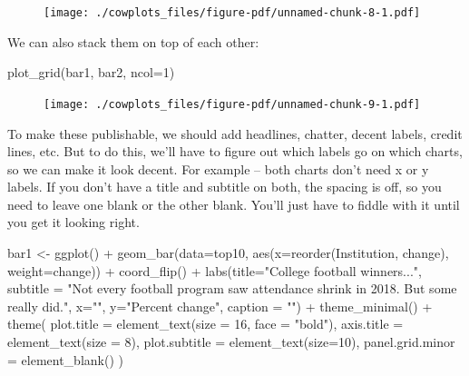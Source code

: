 \documentclass[
  letterpaper,
  DIV=11,
  numbers=noendperiod]{scrreprt}
\newenvironment{Shaded}{\begin{snugshade}}{\end{snugshade}}
\newcommand{\AttributeTok}[1]{\textcolor[rgb]{0.40,0.45,0.13}{#1}}
\newcommand{\DecValTok}[1]{\textcolor[rgb]{0.68,0.00,0.00}{#1}}
\newcommand{\FunctionTok}[1]{\textcolor[rgb]{0.28,0.35,0.67}{#1}}
\newcommand{\NormalTok}[1]{\textcolor[rgb]{0.00,0.23,0.31}{#1}}
\newcommand{\OtherTok}[1]{\textcolor[rgb]{0.00,0.23,0.31}{#1}}
\newcommand{\SpecialCharTok}[1]{\textcolor[rgb]{0.37,0.37,0.37}{#1}}
\newcommand{\StringTok}[1]{\textcolor[rgb]{0.13,0.47,0.30}{#1}}
\begin{document}
\begin{figure}[H]

{\centering \texttt{[image: ./cowplots\_files/figure-pdf/unnamed-chunk-8-1.pdf]}

}

\end{figure}

We can also stack them on top of each other:

\begin{Shaded}
\begin{Highlighting}[]
\FunctionTok{plot\_grid}\NormalTok{(bar1, bar2, }\AttributeTok{ncol=}\DecValTok{1}\NormalTok{) }
\end{Highlighting}
\end{Shaded}

\begin{figure}[H]

{\centering \texttt{[image: ./cowplots\_files/figure-pdf/unnamed-chunk-9-1.pdf]}

}

\end{figure}

To make these publishable, we should add headlines, chatter, decent
labels, credit lines, etc. But to do this, we'll have to figure out
which labels go on which charts, so we can make it look decent. For
example -- both charts don't need x or y labels. If you don't have a
title and subtitle on both, the spacing is off, so you need to leave one
blank or the other blank. You'll just have to fiddle with it until you
get it looking right.

\begin{Shaded}
\begin{Highlighting}[]
\NormalTok{bar1 }\OtherTok{\textless{}{-}} \FunctionTok{ggplot}\NormalTok{() }\SpecialCharTok{+} 
  \FunctionTok{geom\_bar}\NormalTok{(}\AttributeTok{data=}\NormalTok{top10, }\FunctionTok{aes}\NormalTok{(}\AttributeTok{x=}\FunctionTok{reorder}\NormalTok{(Institution, change), }\AttributeTok{weight=}\NormalTok{change)) }\SpecialCharTok{+}
  \FunctionTok{coord\_flip}\NormalTok{() }\SpecialCharTok{+} 
  \FunctionTok{labs}\NormalTok{(}\AttributeTok{title=}\StringTok{"College football winners..."}\NormalTok{, }\AttributeTok{subtitle =} \StringTok{"Not every football program saw attendance shrink in 2018. But some really did."}\NormalTok{,  }\AttributeTok{x=}\StringTok{""}\NormalTok{, }\AttributeTok{y=}\StringTok{"Percent change"}\NormalTok{, }\AttributeTok{caption =} \StringTok{""}\NormalTok{) }\SpecialCharTok{+} 
  \FunctionTok{theme\_minimal}\NormalTok{() }\SpecialCharTok{+} 
  \FunctionTok{theme}\NormalTok{(}
    \AttributeTok{plot.title =} \FunctionTok{element\_text}\NormalTok{(}\AttributeTok{size =} \DecValTok{16}\NormalTok{, }\AttributeTok{face =} \StringTok{"bold"}\NormalTok{),}
    \AttributeTok{axis.title =} \FunctionTok{element\_text}\NormalTok{(}\AttributeTok{size =} \DecValTok{8}\NormalTok{), }
    \AttributeTok{plot.subtitle =} \FunctionTok{element\_text}\NormalTok{(}\AttributeTok{size=}\DecValTok{10}\NormalTok{), }
    \AttributeTok{panel.grid.minor =} \FunctionTok{element\_blank}\NormalTok{()}
\NormalTok{    )}
\end{Highlighting}
\end{Shaded}
\end{document}
